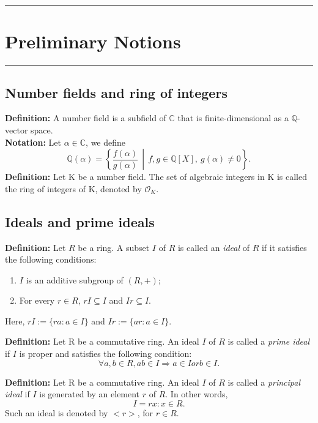 \medskip 
{\color{gray}\hrule}
\section{Preliminary Notions}
\medskip 
{\color{gray}\hrule}
\medskip 
\subsection{Number fields and ring of integers}
\begin{flushleft}
    \quad\textbf{Definition:} A number field is a subfield of $\mathbb{C}$ that is finite-dimensional as a $\mathbb{Q}$-vector space.\\
    \quad\textbf{Notation:} Let $\alpha \in \mathbb{C}$, we define 
    \[
    \mathbb{Q}(\alpha) = \left\{ \frac{f(\alpha)}{g(\alpha)} \,\middle|\, f,g \in \mathbb{Q}[X],\ g(\alpha) \neq 0 \right\}.
    \]
    \quad\textbf{Definition:} Let K be a number field. The set of algebraic integers in K is called the ring of integers of K, denoted by $\mathcal{O}_K$.
\end{flushleft}

\subsection{Ideals and prime ideals}
\begin{flushleft}
    \quad\textbf{Definition:} Let $R$ be a ring. A subset $I$ of $R$ is called an \textit{ideal} of $R$ if it satisfies the following conditions:
    
    \begin{enumerate}
        \item $I$ is an additive subgroup of $(R, +)$;
        \item For every $r \in R$, $rI \subseteq I$ and $Ir \subseteq I$.
    \end{enumerate}
    
    Here, $rI := \{ ra : a \in I \}$ and $Ir := \{ ar : a \in I \}$.
\end{flushleft}
\begin{flushleft}
    \quad\textbf{Definition:} Let R be a commutative ring. An ideal $I$ of $R$ is called a \textit{prime ideal} if $I$ is proper and satisfies the following condition:
    \[
    \forall a, b \in R, ab \in I \Rightarrow a \in I or b \in I.
    \]
\end{flushleft}
\begin{flushleft}
    \quad\textbf{Definition:} Let R be a commutative ring. An ideal $I$ of $R$ is called a \textit{principal ideal} if $I$ is generated by an element $r$ of $R$. In other words, 
    \[
    I = {rx: x \in R}.
    \]
    Such an ideal is denoted by $<r>$, for $r \in R$. 

\end{flushleft}

